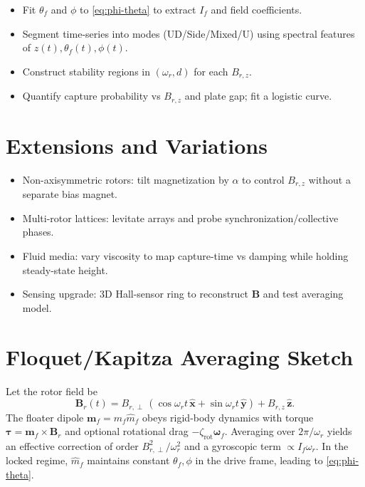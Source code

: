 \documentclass[11pt]{article}
\newcommand{\vect}[1]{\mathbf{#1}}
\theoremstyle{definition}
\theoremstyle{plain}
\begin{document}
\begin{itemize}[leftmargin=1.5em]
  \item Fit \(\theta_f\) and \(\phi\) to \cref{eq:phi-theta} to extract \(I_f\) and field coefficients.
  \item Segment time-series into modes (UD/Side/Mixed/U) using spectral features of \(z(t),\theta_f(t),\phi(t)\).
  \item Construct stability regions in \((\omega_r,d)\) for each \(B_{r,z}\).
  \item Quantify capture probability vs \(B_{r,z}\) and plate gap; fit a logistic curve.
\end{itemize}

\section{Extensions and Variations}
\begin{itemize}[leftmargin=1.5em]
  \item Non-axisymmetric rotors: tilt magnetization by \(\alpha\) to control \(B_{r,z}\) without a separate bias magnet.
  \item Multi-rotor lattices: levitate arrays and probe synchronization/collective phases.
  \item Fluid media: vary viscosity to map capture-time vs damping while holding steady-state height.
  \item Sensing upgrade: 3D Hall-sensor ring to reconstruct \(\vect B\) and test averaging model.
\end{itemize}

\appendix

\section{Floquet/Kapitza Averaging Sketch}
Let the rotor field be
\begin{equation}
  \vect B_r(t)=B_{r,\perp}\,(\cos\omega_r t\,\hat{\vect x}+\sin\omega_r t\,\hat{\vect y}) + B_{r,z}\,\hat{\vect z}.
\end{equation}
The floater dipole \(\vect m_f=m_f \hat m_f\) obeys rigid-body dynamics with torque
\(\boldsymbol\tau=\vect m_f\times \vect B_r\) and optional rotational drag \(-\zeta_{\mathrm{rot}}\boldsymbol\omega_f\).
Averaging over \(2\pi/\omega_r\) yields an effective correction of order \(B_{r,\perp}^2/\omega_r^2\) and a gyroscopic term \(\propto I_f\omega_r\).
In the locked regime, \(\hat m_f\) maintains constant \(\theta_f,\phi\) in the drive frame, leading to \cref{eq:phi-theta}.
\end{document}
